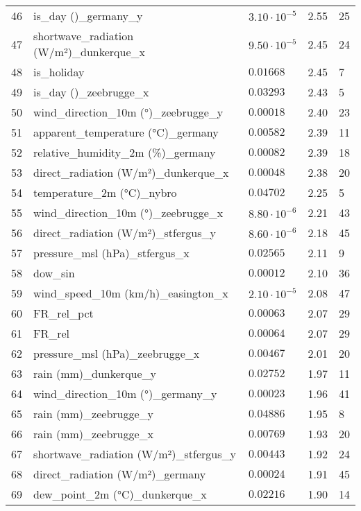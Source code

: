 \begin{table}[H]
\begin{tabular}{r l l l l}
        46 & is\_day ()\_germany\_y & $3.10 \cdot 10^{-5}$ & 2.55 & 25 \\
        47 & shortwave\_radiation (W/m²)\_dunkerque\_x & $9.50 \cdot 10^{-5}$ & 2.45 & 24 \\
        48 & is\_holiday & $0.01668$ & 2.45 & 7 \\
        49 & is\_day ()\_zeebrugge\_x & $0.03293$ & 2.43 & 5 \\
        50 & wind\_direction\_10m (°)\_zeebrugge\_y & $0.00018$ & 2.40 & 23 \\
        51 & apparent\_temperature (°C)\_germany & $0.00582$ & 2.39 & 11 \\
        52 & relative\_humidity\_2m (\%)\_germany & $0.00082$ & 2.39 & 18 \\
        53 & direct\_radiation (W/m²)\_dunkerque\_x & $0.00048$ & 2.38 & 20 \\
        54 & temperature\_2m (°C)\_nybro & $0.04702$ & 2.25 & 5 \\
        55 & wind\_direction\_10m (°)\_zeebrugge\_x & $8.80 \cdot 10^{-6}$ & 2.21 & 43 \\
        56 & direct\_radiation (W/m²)\_stfergus\_y & $8.60 \cdot 10^{-6}$ & 2.18 & 45 \\
        57 & pressure\_msl (hPa)\_stfergus\_x & $0.02565$ & 2.11 & 9 \\
        58 & dow\_sin & $0.00012$ & 2.10 & 36 \\
        59 & wind\_speed\_10m (km/h)\_easington\_x & $2.10 \cdot 10^{-5}$ & 2.08 & 47 \\
        60 & FR\_rel\_pct & $0.00063$ & 2.07 & 29 \\
        61 & FR\_rel & $0.00064$ & 2.07 & 29 \\
        62 & pressure\_msl (hPa)\_zeebrugge\_x & $0.00467$ & 2.01 & 20 \\
        63 & rain (mm)\_dunkerque\_y & $0.02752$ & 1.97 & 11 \\
        64 & wind\_direction\_10m (°)\_germany\_y & $0.00023$ & 1.96 & 41 \\
        65 & rain (mm)\_zeebrugge\_y & $0.04886$ & 1.95 & 8 \\
        66 & rain (mm)\_zeebrugge\_x & $0.00769$ & 1.93 & 20 \\
        67 & shortwave\_radiation (W/m²)\_stfergus\_y & $0.00443$ & 1.92 & 24 \\
        68 & direct\_radiation (W/m²)\_germany & $0.00024$ & 1.91 & 45 \\
        69 & dew\_point\_2m (°C)\_dunkerque\_x & $0.02216$ & 1.90 & 14 \\

\end{tabular}
\end{table}
